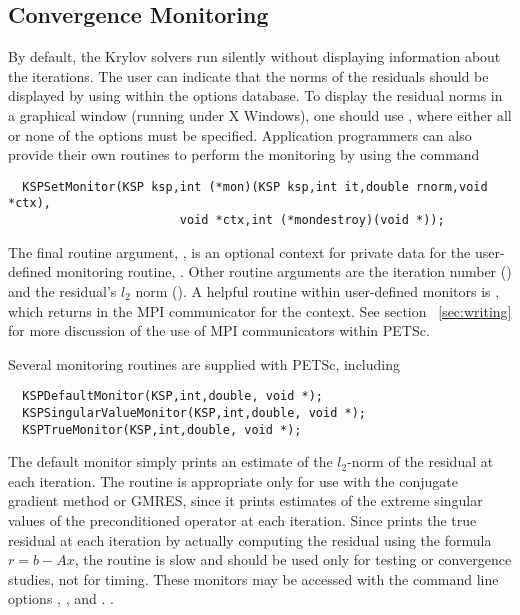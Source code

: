 \subsection{Convergence Monitoring}
\label{sec:kspmonitor}

By default, the Krylov solvers run silently without displaying information 
about the iterations. The user can indicate that the norms of the residuals 
should be displayed by using 
 within the options database.  
To display the residual norms in a graphical window (running under X Windows),
one should use  \trl{[x,y,w,h]}, where either all or none of 
the options must be specified. 
Application programmers can also provide their own routines to perform 
the monitoring by using the command 
\begin{verbatim}
  KSPSetMonitor(KSP ksp,int (*mon)(KSP ksp,int it,double rnorm,void *ctx),
                        void *ctx,int (*mondestroy)(void *));
\end{verbatim}
The final routine argument, , is an optional context for private
data for the user-defined monitoring routine, .  Other
 routine arguments are the iteration
number () and the residual's $ l_2 $ norm ().
A helpful routine within user-defined monitors is 
, which returns
in    the
MPI communicator for the  context.  See section ~\ref{sec:writing}
for more discussion of the use of MPI communicators within PETSc.

Several monitoring routines are supplied with PETSc, 
including  
\begin{verbatim}
  KSPDefaultMonitor(KSP,int,double, void *);
  KSPSingularValueMonitor(KSP,int,double, void *);
  KSPTrueMonitor(KSP,int,double, void *);
\end{verbatim}
The default monitor simply prints an estimate of the $l_2$-norm of the 
residual at each iteration. The routine
 is appropriate only for use with the conjugate 
gradient method or GMRES, since it prints estimates of the extreme singular 
values of the preconditioned operator at each iteration. Since
 prints 
the true residual at each iteration by 
actually computing the residual using the formula $ r = b - Ax $, the routine
is slow and should be used only for testing or convergence studies,
not for timing. These monitors may be accessed with the command line options
, , and .
  .

